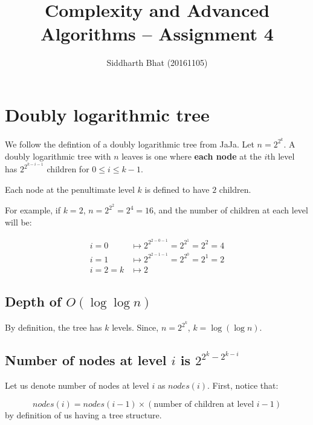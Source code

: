 \documentclass{article}
\author{Siddharth Bhat (20161105)}
\title{Complexity and Advanced Algorithms -- Assignment 4}
\begin{document}
\newcommand{\threesat}{\texttt{3-SAT}~}
\newcommand{\pspace}{\texttt{PSPACE}~}
\newcommand{\np}{\texttt{NP}~}
\newcommand{\nat}{\mathbb{N}~}
\newcommand{\pred}{\mathbb{P}~}
\newcommand{\logspace}{\texttt{LOGSPACE}~}
\newcommand{\nlogspace}{\texttt{NLOGSPACE}~}
\newcommand{\ptime}{\texttt{P}~}
\newcommand{\nptime}{\texttt{NP}~}
\maketitle

\section{Doubly logarithmic tree}
We follow the defintion of a doubly logarithmic tree from JaJa.
Let $n = 2^{2^k}$. A doubly logarithmic tree with $n$ leaves is one where 
\textbf{each node} at the $i$th level has $2^{2^{k - i - 1}}$ children 
for $0 \leq i \leq k - 1$. 

Each node at the penultimate level $k$ is defined to have $2$ children.

For example, if $k = 2$, $n = 2^{2^2} = 2^4 = 16$, and the number of children
at each level will be:

\begin{align*}
i = 0 &\mapsto 2^{2^{2 - 0 - 1}} = 2^{2^1} = 2^2 = 4 \\
i = 1 &\mapsto 2^{2^{2 - 1 - 1}} = 2^{2^0} = 2^1 = 2  \\
i = 2 = k & \mapsto 2
\end{align*}

\subsection{Depth of $O(\log \log n)$}

By definition, the tree has $k$ levels. Since, $n = 2^{2^k}$, $k = \log (\log
n)$.

\subsection{Number of nodes at level $i$ is $2^{2^k - 2^{k - i}}$}
Let us denote number of nodes at level $i$ as $nodes(i)$. First,
notice that:

$$
nodes(i) = nodes(i - 1) \times (\text{number of children at level $i - 1$})
$$
by definition of us having a tree structure.
\end{document}
